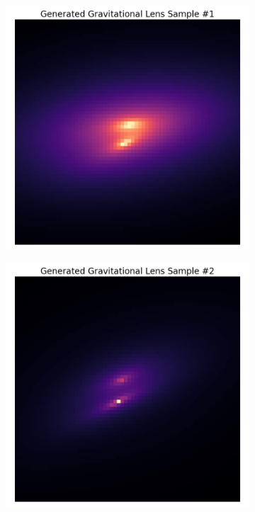 \documentclass[12pt]{article}
\begin{document}
\begin{figure}[thb]
    \centering
    
    \begin{minipage}{\columnwidth}
	\begin{subfigure}{0.5\columnwidth}
    \includegraphics[width=\columnwidth]{../figures/img1.jpg}
    \caption{}
    \label{fig:sample1}
    \end{subfigure}
    \begin{subfigure}{0.5\columnwidth}
    \includegraphics[width=\columnwidth]{../figures/img2.jpg}
    \caption{}
    \label{fig:sample2}
    \end{subfigure}
\end{minipage}


\end{figure}
\end{document}
